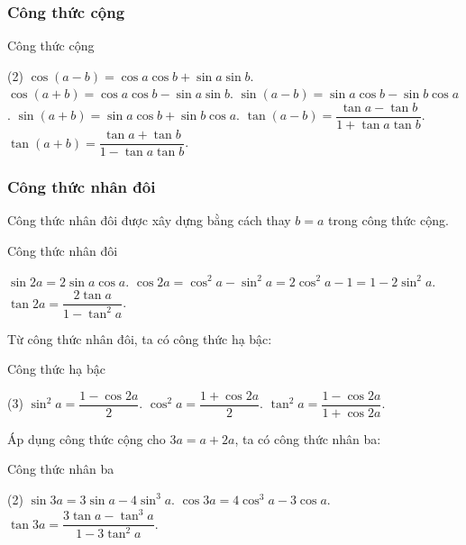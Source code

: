 \begin{tomtat}
	\subsubsection{Công thức cộng}
	\begin{khung4}{Công thức cộng}
	\begin{tasks}[style=itemize](2)
		\task $\cos (a-b) = \cos a \cos b + \sin a\sin b$.
		\task $\cos (a+b) = \cos a \cos b - \sin a\sin b$.
		\task $\sin (a-b) = \sin a \cos b - \sin b \cos a$.
		\task $\sin (a+b) = \sin a \cos b + \sin b \cos a$.
		\task $\tan (a-b) = \dfrac{\tan a - \tan b}{1+\tan a \tan b}$.
		\task $\tan (a+b) = \dfrac{\tan a + \tan b}{1-\tan a \tan b}$.
	\end{tasks}
	\end{khung4}
	\subsubsection{Công thức nhân đôi}
	Công thức nhân đôi được xây dựng bằng cách thay $b=a$ trong công thức cộng.
	\begin{khung4}{Công thức nhân đôi}
		\begin{tasks}[style=itemize]
			\task $\sin 2a = 2\sin a \cos a$.
			\task $\cos 2a = \cos^2a-\sin^2a = 2\cos^2a-1 = 1-2\sin^2a$.
			\task $\tan 2a = \dfrac{2\tan a}{1-\tan^2a}$.
		\end{tasks}
		\end{khung4}
\begin{note}
	Từ công thức nhân đôi, ta có công thức hạ bậc:
\end{note}
	\begin{khung4}{Công thức hạ bậc}
		\begin{tasks}[style=itemize](3)
			\task $\sin^2a= \dfrac{1-\cos 2a}{2}$.
		\task $\cos^2a = \dfrac{1+\cos 2a}{2}$.
		\task $\tan^2a=\dfrac{1-\cos2a}{1+\cos 2a}$.
		\end{tasks}
		\end{khung4}

\begin{note}
	Áp dụng công thức cộng cho $3a = a +2a$, ta có công thức nhân ba:
\end{note}
	\begin{khung4}{Công thức nhân ba}
		\begin{tasks}[style=itemize](2)
			\task $\sin3a= 3\sin a -4\sin^3a$.
		\task $\cos3a= 4\cos^3a-3\cos a$.
		\task $\tan3a = \dfrac{3\tan a - \tan^3 a}{1-3\tan^2a}$.
		\end{tasks}
		\end{khung4}


\end{tomtat}
